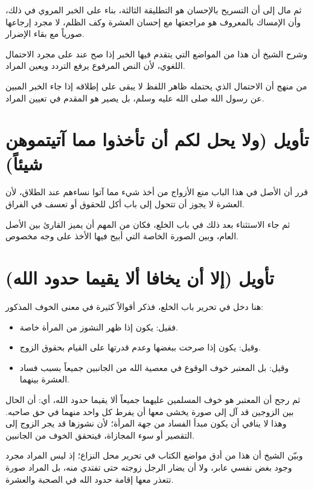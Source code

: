 ثم مال إلى أن التسريح بالإحسان هو التطليقة الثالثة، بناء على الخبر المروي في ذلك، وأن الإمساك بالمعروف هو مراجعتها مع إحسان العشرة وكف الظلم، لا مجرد إرجاعها صورياً مع بقاء الإضرار.

وشرح الشيخ أن هذا من المواضع التي يتقدم فيها الخبر إذا صح عند  على مجرد الاحتمال اللغوي، لأن النص المرفوع يرفع التردد ويعين المراد.

\begin{fawaid}
من منهج  أن الاحتمال الذي يحتمله ظاهر اللفظ لا يبقى على إطلاقه إذا جاء الخبر المبين عن رسول الله صلى الله عليه وسلم، بل يصير هو المقدم في تعيين المراد.
\end{fawaid}

\separator

\section{تأويل (ولا يحل لكم أن تأخذوا مما آتيتموهن شيئاً)}
قرر  أن الأصل في هذا الباب منع الأزواج من أخذ شيء مما آتوا نساءهم عند الطلاق، لأن العشرة لا يجوز أن تتحول إلى باب أكل للحقوق أو تعسف في الفراق.

ثم جاء الاستثناء بعد ذلك في باب الخلع، فكان من المهم أن يميز القارئ بين الأصل العام، وبين الصورة الخاصة التي أبيح فيها الأخذ على وجه مخصوص.

\section{تأويل (إلا أن يخافا ألا يقيما حدود الله)}
هنا دخل  في تحرير باب الخلع، فذكر أقوالاً كثيرة في معنى الخوف المذكور:
\begin{itemize}
    \item فقيل: يكون إذا ظهر النشوز من المرأة خاصة.
    \item وقيل: يكون إذا صرحت ببغضها وعدم قدرتها على القيام بحقوق الزوج.
    \item وقيل: بل المعتبر خوف الوقوع في معصية الله من الجانبين جميعاً بسبب فساد العشرة بينهما.
\end{itemize}

ثم رجح أن المعتبر هو خوف المسلمين عليهما جميعاً ألا يقيما حدود الله، أي: أن الحال بين الزوجين قد آل إلى صورة يخشى معها أن يفرط كل واحد منهما في حق صاحبه. وهذا لا ينافي أن يكون مبدأ الفساد من جهة المرأة؛ لأن نشوزها قد يجر الزوج إلى التقصير أو سوء المجازاة، فيتحقق الخوف من الجانبين.

وبيّن الشيخ أن هذا من أدق مواضع الكتاب في تحرير محل النزاع؛ إذ ليس المراد مجرد وجود بغض نفسي عابر، ولا أن يضار الرجل زوجته حتى تفتدي منه، بل المراد صورة تتعذر معها إقامة حدود الله في الصحبة والعشرة.

